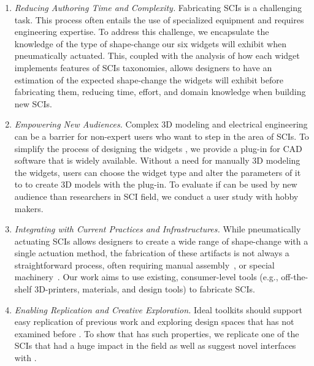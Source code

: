     \begin{enumerate}
      \item \textit{Reducing Authoring Time and Complexity.}
        Fabricating SCIs is a challenging task. This process often entails the
        use of specialized equipment and requires engineering expertise. To
        address this challenge, we encapsulate the knowledge of the type of
        shape-change our six widgets will exhibit when pneumatically actuated.
        This, coupled with the analysis of how each widget implements features
        of SCIs taxonomies, allows designers to have an estimation of the
        expected shape-change the widgets will exhibit before fabricating them,
        reducing time, effort, and domain knowledge when building new SCIs.
        
      \item \textit{Empowering New Audiences.}
        Complex 3D modeling and electrical engineering can be a barrier for
        non-expert users who want to step in the area of SCIs. To simplify the
        process of designing the widgets \cite{Olsen:2007ik}, we provide a
        plug-in for CAD software that is widely available. Without a need for
        manually 3D modeling the widgets, users can choose the widget type and
        alter the parameters of it to to create 3D models with the plug-in. To
        evaluate if \mp can be used by new audience than researchers in SCI
        field, we conduct a user study with hobby makers.
        
      \item \textit{Integrating with Current Practices and Infrastructures.}
        While pneumatically actuating SCIs allows designers to create a wide
        range of shape-change with a single actuation method, the fabrication of
        these artifacts is not always a straightforward process, often requiring
        manual assembly~\cite{Yao:2013}, or special machinery~\cite{Sareen:2017,
        Ou:2016}. Our work aims to use existing, consumer-level tools (e.g.,
        off-the-shelf 3D-printers, materials, and design tools) to fabricate
        SCIs.
        
      \item \textit{Enabling Replication and Creative Exploration.}
        Ideal toolkits should support easy replication of previous work
        \cite{Greenberg2007} and exploring design spaces that has not examined
        before \cite{Olsen:2007ik}. To show that \mp has such properties, we
        replicate one of the SCIs that had a huge impact in the field
        \cite{Follmer:2013} as well as suggest novel interfaces with \mp.
    \end{enumerate}
          
